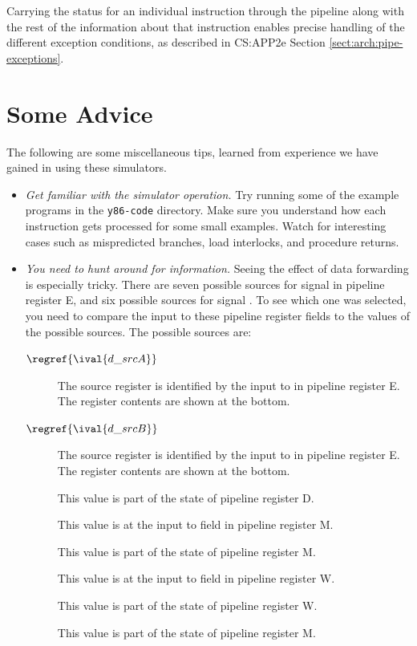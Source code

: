 \documentclass[11pt]{article}
\begin{document}
Carrying the status for an individual instruction through
 the pipeline along with the rest of the information about that
 instruction enables precise handling of the different exception
 conditions, as described in CS:APP2e Section \ref{sect:arch:pipe-exceptions}.

\section{Some Advice}

The following are some miscellaneous tips, learned from experience we
have gained in using these simulators.

\begin{itemize}
\item {\em Get familiar with the simulator operation.}  Try running
some of the example programs in the \texttt{y86-code} directory.  Make
sure you understand how each instruction gets processed for some small
examples.  Watch for interesting cases such as mispredicted branches,
load interlocks, and procedure returns.

\item {\em You need to hunt around for information.}  Seeing the
effect of data forwarding is especially tricky.  There are seven
possible sources for signal  in pipeline register E, and
six possible sources for signal \@.  To see which one was
selected, you need to compare the input to these pipeline register
fields to the values of the possible sources.
The possible sources
are:
\begin{description}
\item[$\regref{\ival{d\_srcA}}$] The source register is identified by
the input to  in pipeline register E\@.  The register contents are shown at the bottom.
\item[$\regref{\ival{d\_srcB}}$] The source register is identified by
the input to  in pipeline register E\@.  The register contents are shown at the bottom.
\item[] This value is part of the state of pipeline register D\@.
\item[] This value is at the input to field 
in pipeline register M\@.
\item[] This value is part of the state of pipeline register M\@.
\item[] This value is at the input to field 
in pipeline register W.
\item[] This value is part of the state of pipeline register W\@.
\item[] This value is part of the state of pipeline register M\@.
\end{description}


\end{itemize}
\end{document}

